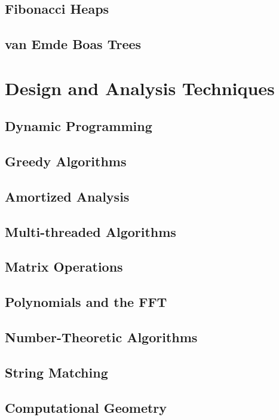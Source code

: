 \documentclass[10pt]{book}
\begin{document}
			\section{Fibonacci Heaps}

			\section{van Emde Boas Trees}

		\chapter{Design and Analysis Techniques}
			\section{Dynamic Programming}

			\section{Greedy Algorithms}

			\section{Amortized Analysis}

			\section{Multi-threaded Algorithms}

			\section{Matrix Operations}

			\section{Polynomials and the FFT}

			\section{Number-Theoretic Algorithms}

			\section{String Matching}

			\section{Computational Geometry}
\end{document}
